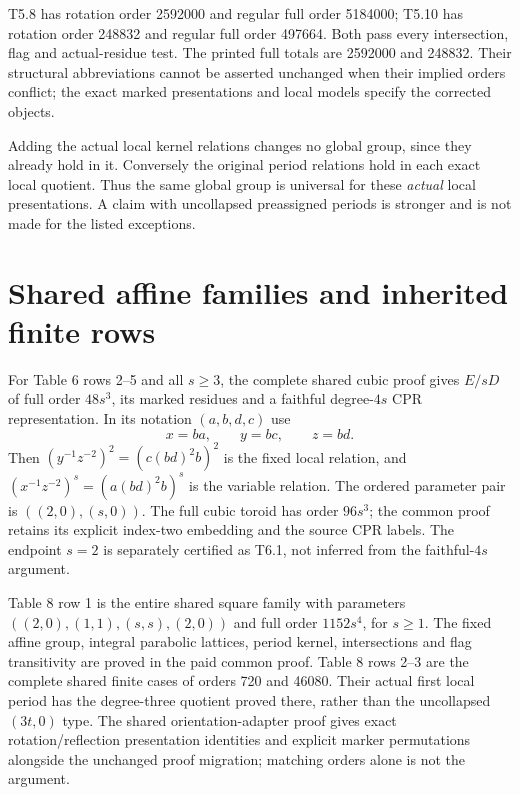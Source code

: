 \documentclass[10pt,a4paper]{article}
\begin{document}
T5.8 has rotation order 2592000 and regular full order 5184000;
T5.10 has rotation order 248832 and regular full order 497664.
Both pass every intersection, flag and actual-residue test. The printed
full totals are 2592000 and 248832. Their structural abbreviations cannot
be asserted unchanged when their implied orders conflict; the exact
marked presentations and local models specify the corrected objects.

Adding the actual local kernel relations changes no global group,
since they already hold in it. Conversely the original period
relations hold in each exact local quotient. Thus the same global
group is universal for these \emph{actual} local presentations.
A claim with uncollapsed preassigned periods is stronger and is not
made for the listed exceptions.

\section{Shared affine families and inherited finite rows}
For Table 6 rows 2--5 and all $s\ge3$, the complete shared cubic proof
gives $E/sD$ of full order $48s^3$, its marked residues and a faithful
degree-$4s$ CPR representation. In its notation $(a,b,d,c)$ use
\[x=ba,\qquad y=bc,\qquad z=bd.\]
Then $(y^{-1}z^{-2})^2=(c(bd)^2b)^2$ is the fixed local relation,
and $(x^{-1}z^{-2})^s=(a(bd)^2b)^s$ is the variable relation.
The ordered parameter pair is $((2,0),(s,0))$. The full cubic toroid
has order $96s^3$; the common proof retains its explicit index-two
embedding and the source CPR labels. The endpoint $s=2$ is separately
certified as T6.1, not inferred from the faithful-$4s$ argument.

Table 8 row 1 is the entire shared square family with parameters
$((2,0),(1,1),(s,s),(2,0))$ and full order $1152s^4$, for $s\ge1$.
The fixed affine group, integral parabolic lattices, period kernel,
intersections and flag transitivity are proved in the paid common
proof. Table 8 rows 2--3 are the complete shared finite cases of orders 720
and 46080. Their actual first local period has the degree-three quotient
proved there, rather than the uncollapsed $(3t,0)$ type. The shared orientation-adapter proof gives exact rotation/reflection
presentation identities and explicit marker permutations alongside the
unchanged proof migration; matching orders alone is not the argument.
\end{document}
